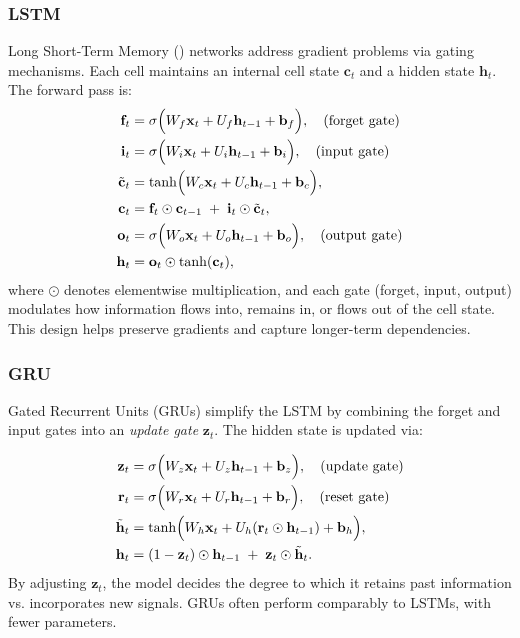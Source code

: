 \documentclass[11pt]{article}
\begin{document}
\subsubsection{LSTM}
Long Short-Term Memory (\cite{lstmpaper}) networks address gradient problems via gating mechanisms. Each cell maintains an internal cell state \(\mathbf{c}_t\) and a hidden state \(\mathbf{h}_t\). The forward pass is:
\begin{align}
    \mathbf{f}_t &= \sigma\Bigl(W_f \mathbf{x}_t + U_f \mathbf{h}_{t-1} + \mathbf{b}_f\Bigr), \quad \text{(forget gate)} \\
    \mathbf{i}_t &= \sigma\Bigl(W_i \mathbf{x}_t + U_i \mathbf{h}_{t-1} + \mathbf{b}_i\Bigr), \quad \text{(input gate)} \\
    \tilde{\mathbf{c}}_t &= \tanh\Bigl(W_c \mathbf{x}_t + U_c \mathbf{h}_{t-1} + \mathbf{b}_c\Bigr), \\
    \mathbf{c}_t &= \mathbf{f}_t \odot \mathbf{c}_{t-1} \;+\; \mathbf{i}_t \odot \tilde{\mathbf{c}}_t, \\
    \mathbf{o}_t &= \sigma\Bigl(W_o \mathbf{x}_t + U_o \mathbf{h}_{t-1} + \mathbf{b}_o\Bigr), \quad \text{(output gate)} \\
    \mathbf{h}_t &= \mathbf{o}_t \odot \tanh(\mathbf{c}_t),
\end{align}
where \(\odot\) denotes elementwise multiplication, and each gate (forget, input, output) modulates how information flows into, remains in, or flows out of the cell state. This design helps preserve gradients and capture longer-term dependencies.

\subsubsection{GRU}
Gated Recurrent Units (GRUs) simplify the LSTM by combining the forget and input gates into an \emph{update gate} \(\mathbf{z}_t\). The hidden state is updated via:

\begin{align}
    \mathbf{z}_t &= \sigma\Bigl(W_z \mathbf{x}_t + U_z \mathbf{h}_{t-1} + \mathbf{b}_z\Bigr), 
    \quad \text{(update gate)} \\
    \mathbf{r}_t &= \sigma\Bigl(W_r \mathbf{x}_t + U_r \mathbf{h}_{t-1} + \mathbf{b}_r\Bigr), 
    \quad \text{(reset gate)} \\
    \tilde{\mathbf{h}}_t &= \tanh\Bigl(W_h \mathbf{x}_t + U_h(\mathbf{r}_t \odot \mathbf{h}_{t-1}) + \mathbf{b}_h\Bigr), \\
    \mathbf{h}_t &= (1 - \mathbf{z}_t)\odot \mathbf{h}_{t-1}
    \;+\; \mathbf{z}_t \odot \tilde{\mathbf{h}}_t.
\end{align}
By adjusting \(\mathbf{z}_t\), the model decides the degree to which it retains past information vs. incorporates new signals. GRUs often perform comparably to LSTMs, with fewer parameters.
\end{document}
